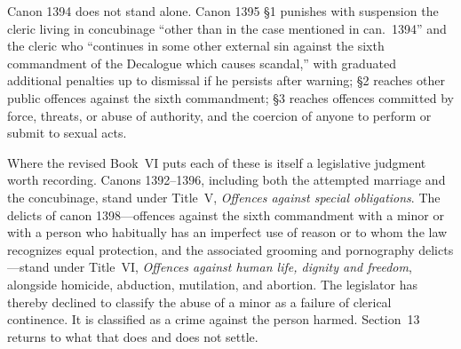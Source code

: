 Canon 1394 does not stand alone. Canon 1395 §1 punishes with suspension the cleric living in concubinage ``other than in the case mentioned in can.~1394'' and the cleric who ``continues in some other external sin against the sixth commandment of the Decalogue which causes scandal,'' with graduated additional penalties up to dismissal if he persists after warning; §2 reaches other public offences against the sixth commandment; §3 reaches offences committed by force, threats, or abuse of authority, and the coercion of anyone to perform or submit to sexual acts.

Where the revised Book~VI puts each of these is itself a legislative judgment worth recording. Canons 1392--1396, including both the attempted marriage and the concubinage, stand under Title~V, \emph{Offences against special obligations}. The delicts of canon 1398---offences against the sixth commandment with a minor or with a person who habitually has an imperfect use of reason or to whom the law recognizes equal protection, and the associated grooming and pornography delicts---stand under Title~VI, \emph{Offences against human life, dignity and freedom}, alongside homicide, abduction, mutilation, and abortion. The legislator has thereby declined to classify the abuse of a minor as a failure of clerical continence. It is classified as a crime against the person harmed. Section~13 returns to what that does and does not settle.
